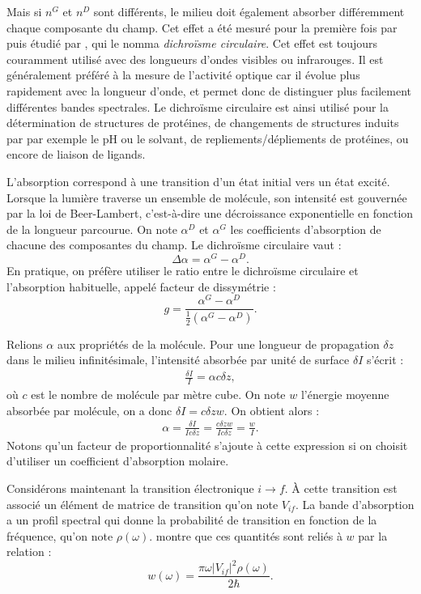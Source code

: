 Mais si $n^{G}$ et $n^{D}$ sont différents, le milieu doit également absorber différemment chaque composante du champ. Cet effet a été mesuré pour la première fois par  puis étudié par , qui le nomma \textit{dichroïsme circulaire}. Cet effet est toujours couramment utilisé avec des longueurs d'ondes visibles ou infrarouges. Il est généralement préféré à la mesure de l'activité optique car il évolue plus rapidement avec la longueur d'onde, et permet donc de distinguer plus facilement différentes bandes spectrales. Le dichroïsme circulaire est ainsi utilisé pour la détermination de structures de protéines, de changements de structures induits par par exemple le pH ou le solvant, de repliements/dépliements de protéines, ou encore de liaison de ligands.

L'absorption correspond à une transition d'un état initial vers un état excité. Lorsque la lumière traverse un ensemble de molécule, son intensité est gouvernée par la loi de Beer-Lambert, c'est-à-dire une décroissance exponentielle en fonction de la longueur parcourue. On note $\alpha^{D}$ et $\alpha^{G}$ les coefficients d'absorption de chacune des composantes du champ. Le dichroïsme circulaire vaut :
\[\Delta \alpha = \alpha^{G}-\alpha^{D}.\]
En pratique, on préfère utiliser le ratio entre le dichroïsme circulaire et l'absorption habituelle, appelé facteur de dissymétrie  : 
\begin{equation}
g = \frac{\alpha^{G}-\alpha^{D}}{\frac{1}{2}(\alpha^{G}-\alpha^{D})}.
\label{eq:kuhn}
\end{equation}

Relions $\alpha$ aux propriétés de la molécule. Pour une longueur de propagation $\delta z$ dans le milieu infinitésimale, l'intensité absorbée par unité de surface $\delta I$ s'écrit :
\begin{align*}
\frac{\delta I}{I} = \alpha c \delta z,
\end{align*}
où $c$ est le nombre de molécule par mètre cube. On note $w$ l'énergie moyenne absorbée par molécule, on a donc $\delta I = c \delta z w$. On obtient alors :
\begin{align}
\alpha = \frac{\delta I}{Ic \delta z} = \frac{c \delta z w}{Ic \delta z} = \frac{w}{I}.
\label{eq:cd1}
\end{align}
Notons qu'un facteur de proportionnalité s'ajoute à cette expression si on choisit d'utiliser un coefficient d'absorption molaire.

Considérons maintenant la transition électronique $i\rightarrow f$. \`A cette transition est associé un élément de matrice de transition qu'on note $V_{if}$. La bande d'absorption a un profil spectral qui donne la probabilité de transition en fonction de la fréquence, qu'on note $\rho(\omega)$.  montre que ces quantités sont reliés à $w$ par la relation :
\begin{equation}
w(\omega) = \frac{\pi \omega |V_{if}|^2 \rho(\omega)}{2\hbar}.
\label{eq:cd2}
\end{equation}

